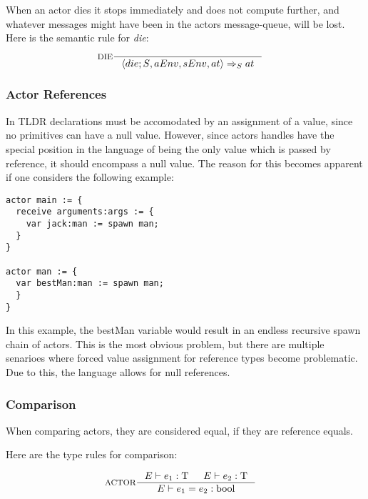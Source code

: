 When an actor dies it stops immediately and does not compute further, and whatever messages might have been in the actors message-queue, will be lost.
Here is the semantic rule for \emph{die}:
\begin{align*}
&\inference[DIE]{}
                 {\Braket{{die;S}, aEnv, sEnv, at} \Rightarrow_S at}
\end{align*}

\subsubsection{Actor References}

In TLDR declarations must be accomodated by an assignment of a value, since no primitives can have a null value. However, since actors handles have the special position in the language of being the only value which is passed by reference, it should encompass a null value. The reason for this becomes apparent if one considers the following example:

\begin{lstlisting}
actor main := {
  receive arguments:args := {
    var jack:man := spawn man;
  }
}

actor man := {
  var bestMan:man := spawn man;
  }
}
\end{lstlisting}

In this example, the bestMan variable would result in an endless recursive spawn chain of actors. This is the most obvious problem, but there are multiple senarioes where forced value assignment for reference types become problematic. Due to this, the language allows for null references.

\subsubsection{Comparison}

When comparing actors, they are considered equal, if they are reference equals.

Here are the type rules for comparison:

\begin{align*}
&\inference[ACTOR]{\Tenv e_1: \Tt & \Tenv e_2: \Tt}
                 {\Tenv e_1 = e_2: \Tbool}                 
\end{align*}
